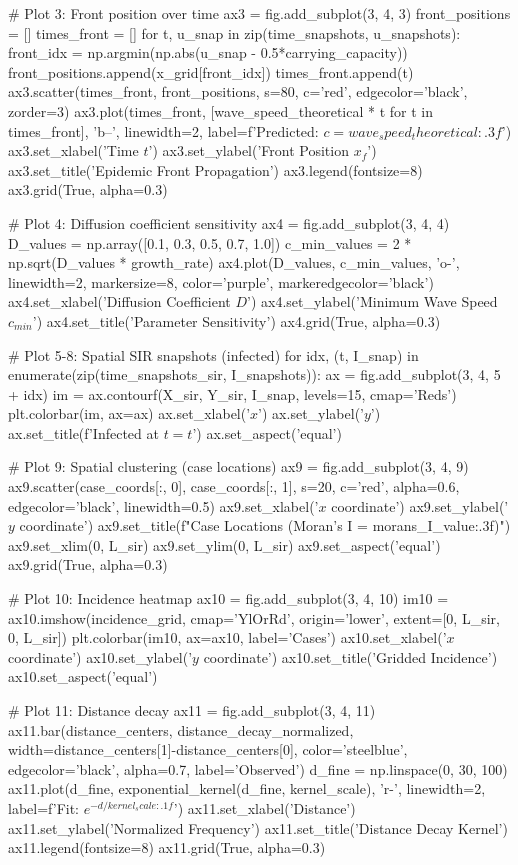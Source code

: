 \documentclass[a4paper, 11pt]{article}
\begin{document}
\begin{pycode}
# Plot 3: Front position over time
ax3 = fig.add_subplot(3, 4, 3)
front_positions = []
times_front = []
for t, u_snap in zip(time_snapshots, u_snapshots):
    front_idx = np.argmin(np.abs(u_snap - 0.5*carrying_capacity))
    front_positions.append(x_grid[front_idx])
    times_front.append(t)
ax3.scatter(times_front, front_positions, s=80, c='red', edgecolor='black', zorder=3)
ax3.plot(times_front, [wave_speed_theoretical * t for t in times_front],
         'b--', linewidth=2, label=f'Predicted: $c={wave_speed_theoretical:.3f}$')
ax3.set_xlabel('Time $t$')
ax3.set_ylabel('Front Position $x_f$')
ax3.set_title('Epidemic Front Propagation')
ax3.legend(fontsize=8)
ax3.grid(True, alpha=0.3)

# Plot 4: Diffusion coefficient sensitivity
ax4 = fig.add_subplot(3, 4, 4)
D_values = np.array([0.1, 0.3, 0.5, 0.7, 1.0])
c_min_values = 2 * np.sqrt(D_values * growth_rate)
ax4.plot(D_values, c_min_values, 'o-', linewidth=2, markersize=8,
         color='purple', markeredgecolor='black')
ax4.set_xlabel('Diffusion Coefficient $D$')
ax4.set_ylabel('Minimum Wave Speed $c_{min}$')
ax4.set_title('Parameter Sensitivity')
ax4.grid(True, alpha=0.3)

# Plot 5-8: Spatial SIR snapshots (infected)
for idx, (t, I_snap) in enumerate(zip(time_snapshots_sir, I_snapshots)):
    ax = fig.add_subplot(3, 4, 5 + idx)
    im = ax.contourf(X_sir, Y_sir, I_snap, levels=15, cmap='Reds')
    plt.colorbar(im, ax=ax)
    ax.set_xlabel('$x$')
    ax.set_ylabel('$y$')
    ax.set_title(f'Infected at $t = {t}$')
    ax.set_aspect('equal')

# Plot 9: Spatial clustering (case locations)
ax9 = fig.add_subplot(3, 4, 9)
ax9.scatter(case_coords[:, 0], case_coords[:, 1], s=20, c='red', alpha=0.6, edgecolor='black', linewidth=0.5)
ax9.set_xlabel('$x$ coordinate')
ax9.set_ylabel('$y$ coordinate')
ax9.set_title(f"Case Locations (Moran's I = {morans_I_value:.3f})")
ax9.set_xlim(0, L_sir)
ax9.set_ylim(0, L_sir)
ax9.set_aspect('equal')
ax9.grid(True, alpha=0.3)

# Plot 10: Incidence heatmap
ax10 = fig.add_subplot(3, 4, 10)
im10 = ax10.imshow(incidence_grid, cmap='YlOrRd', origin='lower', extent=[0, L_sir, 0, L_sir])
plt.colorbar(im10, ax=ax10, label='Cases')
ax10.set_xlabel('$x$ coordinate')
ax10.set_ylabel('$y$ coordinate')
ax10.set_title('Gridded Incidence')
ax10.set_aspect('equal')

# Plot 11: Distance decay
ax11 = fig.add_subplot(3, 4, 11)
ax11.bar(distance_centers, distance_decay_normalized, width=distance_centers[1]-distance_centers[0],
         color='steelblue', edgecolor='black', alpha=0.7, label='Observed')
d_fine = np.linspace(0, 30, 100)
ax11.plot(d_fine, exponential_kernel(d_fine, kernel_scale), 'r-', linewidth=2,
         label=f'Fit: $e^{{-d/{kernel_scale:.1f}}}$')
ax11.set_xlabel('Distance')
ax11.set_ylabel('Normalized Frequency')
ax11.set_title('Distance Decay Kernel')
ax11.legend(fontsize=8)
ax11.grid(True, alpha=0.3)


\end{pycode}
\end{document}
